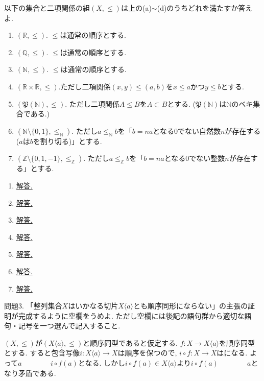 \documentclass[dvipdfmx,a4paper,11pt]{article}
\newcommand{\R}{\mathbb{R}}
\newcommand{\Z}{\mathbb{Z}}
\newcommand{\Q}{\mathbb{Q}}
\newcommand{\N}{\mathbb{N}}
\theoremstyle{definition}
\begin{document}
以下の集合と二項関係の組$(X, \le)$は上の(a)$\sim$(d)のうちどれを満たすか答えよ.
\begin{enumerate}[label=(\arabic*).]
 \setlength{\parskip}{0cm}
  \setlength{\itemsep}{0pt}
 \item $(\R, \le)$. $\le$は通常の順序とする. 
 \item $(\Q, \le)$. $\le$は通常の順序とする. 
 \item $(\N, \le)$. $\le$は通常の順序とする. 
\item $(\R \times \R, \le). $ただし二項関係$(x,y) \le (a, b)$を$x \le a$かつ$y \le b$とする. 
\item $(\mathfrak{P}(\N), \le)$. ただし二項関係$A \le B$を$A \subset B$とする. ($\mathfrak{P}(\N)$は$\N$のベキ集合である.)
\item $(\N \setminus \{ 0,1\}, \le_{\N})$. ただし$a \le_{\N} b$を「$b=na$となる0でない自然数$n$が存在する($a$は$b$を割り切る)」とする.
\item $(\Z\setminus \{ 0,1, -1\}, \le_{\Z})$. ただし$a \le_{\Z} b$を「$b=na$となる0でない整数$n$が存在する」とする.
\end{enumerate}
    
\begin{enumerate}[label=(\arabic*).]
 \setlength{\parskip}{0cm}
  \setlength{\itemsep}{0pt}
\item \underline{解答.\hspace{4cm}}
\item \underline{解答.\hspace{4cm}}\item \underline{解答.\hspace{4cm}}\item \underline{解答.\hspace{4cm}}
\item \underline{解答.\hspace{4cm}}\item \underline{解答.\hspace{4cm}}\item \underline{解答.\hspace{4cm}}

\end{enumerate}

\medskip
問題3. 「整列集合$X$はいかなる切片$X\langle a\rangle$とも順序同形にならない」の主張の証明が完成するように空欄をうめよ. ただし空欄には後記の語句群から適切な語句・記号を一つ選んで記入すること.

\medskip
[証明.]
$(X, \le)$が$(X\langle a\rangle, \le)$と順序同型であると仮定する.
$f : X \to X\langle a\rangle$を順序同型とする. 
すると包含写像$i : X\langle a\rangle \to X$は順序を保つので, 
$i \circ f : X\to X$は\boxed{\phantom{hogehoge}}になる.
よって$a \boxed{\phantom{hogehoge}} i \circ f(a)$となる. しかし$i \circ f(a) \in X\langle a\rangle$より$i \circ f(a) \boxed{\phantom{hogehoge}} a$となり矛盾である. 
\end{document}
